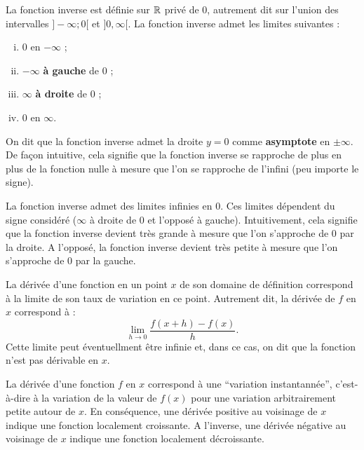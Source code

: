 \documentclass[a4paper, 12pt]{report}
\begin{document}
\begin{prop}
La fonction inverse est définie sur $\mathbb{R}$ privé de 0, autrement dit sur l'union des intervalles $]-\infty ; 0 [$ et $]0, \infty[$.
La fonction inverse admet les limites suivantes :

\begin{enumerate}[(i)]
\item 0 en $-\infty$ ;
\item $-\infty$ \textbf{à gauche} de 0 ;
\item $\infty$ \textbf{à droite} de 0 ;
\item 0 en $\infty$.
\end{enumerate}

\end{prop}

\begin{nomen}
On dit que la fonction inverse admet la droite $y=0$ comme \textbf{asymptote} en $\pm \infty$. 
De façon intuitive, cela signifie que la fonction inverse se rapproche de plus en plus de la fonction nulle 
à mesure que l'on se rapproche de l'infini (peu importe le signe).
\end{nomen}

\begin{rmq}
La fonction inverse admet des limites infinies en 0. Ces limites dépendent du signe considéré 
($\infty$ à droite de 0 et l'opposé à gauche). 
Intuitivement, cela signifie que la fonction inverse devient très grande à mesure que l'on s'approche de 0 par la droite.
A l'opposé, la fonction inverse devient très petite à mesure que l'on s'approche de 0 par la gauche.
\end{rmq}

\begin{rapl}
La dérivée d'une fonction en un point $x$ de son domaine de définition correspond à la limite de son taux de variation en ce point.
Autrement dit, la dérivée de $f$ en $x$ correspond à :
\[ \lim_{h \to 0} \dfrac{f(x+h)-f(x)}{h} . \]
Cette limite peut éventuellment être infinie et, dans ce cas, on dit que la fonction n'est pas dérivable en $x$.
\end{rapl}

\begin{rmq}
La dérivée d'une fonction $f$ en $x$ correspond à une ``variation instantannée'', 
c'est-à-dire à la variation de la valeur de $f(x)$ pour une variation arbitrairement petite autour de $x$.
En conséquence, une dérivée positive au voisinage de $x$ indique une fonction localement croissante. 
A l'inverse, une dérivée négative au voisinage de $x$ indique une fonction localement décroissante. 
\end{rmq}
\end{document}
